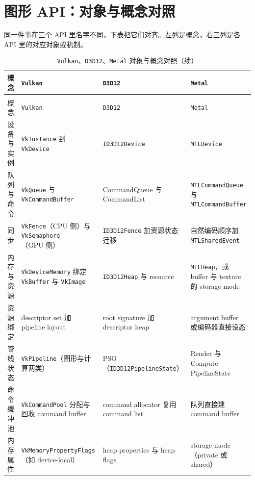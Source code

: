 \documentclass[12pt,a4paper,fontset=fandol]{ctexbook}
\newcommand{\Tp}[1]{\texttt{#1}}
\begin{document}
\section{图形 API：对象与概念对照}

同一件事在三个 API 里名字不同，下表把它们对齐。左列是概念，右三列是各 API
里的对应对象或机制。

\begin{longtable}{>{\raggedright\arraybackslash}p{}
                  >{\raggedright\arraybackslash}p{}
                  >{\raggedright\arraybackslash}p{}
                  >{\raggedright\arraybackslash}p{}}
\caption{\Tp{Vulkan}、\Tp{D3D12}、\Tp{Metal} 对象与概念对照}\label{tab:apB-api} \\
\toprule
概念 & \Tp{Vulkan} & \Tp{D3D12} & \Tp{Metal} \\
\midrule
\endfirsthead
\caption[]{\Tp{Vulkan}、\Tp{D3D12}、\Tp{Metal} 对象与概念对照（续）}\\
\toprule
概念 & \Tp{Vulkan} & \Tp{D3D12} & \Tp{Metal} \\
\midrule
\endhead
\bottomrule
\endfoot
设备与实例 & \Tp{VkInstance} 到 \Tp{VkDevice} & \Tp{ID3D12Device} & \Tp{MTLDevice} \\
队列与命令 & \Tp{VkQueue} 与 \Tp{Vk}\allowbreak\Tp{CommandBuffer} & CommandQueue 与 CommandList & \Tp{MTL}\allowbreak\Tp{CommandQueue} 与 \Tp{MTL}\allowbreak\Tp{CommandBuffer} \\
同步 & \Tp{VkFence}（CPU 侧）与 \Tp{VkSemaphore}（GPU 侧） & \Tp{ID3D12Fence} 加资源状态迁移 & 自然编码顺序加 \Tp{MTL}\allowbreak\Tp{SharedEvent} \\
内存与资源 & \Tp{Vk}\allowbreak\Tp{DeviceMemory} 绑定 \Tp{VkBuffer} 与 \Tp{VkImage} & \Tp{ID3D12Heap} 与 resource & \Tp{MTLHeap}，或 buffer 与 texture 的 storage mode \\
资源绑定 & descriptor set 加 pipeline layout & root signature 加 descriptor heap & argument buffer 或编码器直接设态 \\
管线状态 & \Tp{VkPipeline}（图形与计算两类） & PSO（\Tp{ID3D12}\allowbreak\Tp{PipelineState}） & Render 与 Compute PipelineState \\
命令缓冲池 & \Tp{Vk}\allowbreak\Tp{CommandPool} 分配与回收 command buffer & command allocator 复用 command list & 队列直接建 command buffer \\
内存属性 & \Tp{Vk}\allowbreak\Tp{Memory\allowbreak PropertyFlags}（如 device-local） & heap properties 与 heap flags & storage mode（private 或 shared） \\
\end{longtable}
\end{document}
